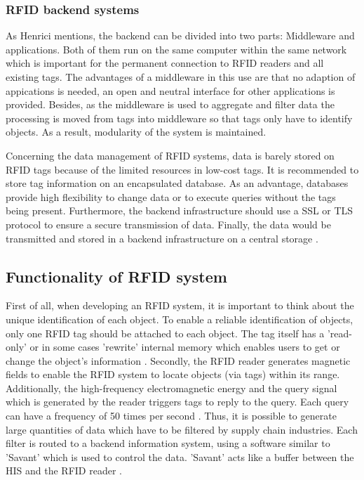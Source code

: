 \subsubsection{RFID backend systems} \label{backend}

As Henrici \cite{henrici} mentions, the backend can be divided into two parts: Middleware and applications. Both of them run on the same computer within the same network which is important for the permanent connection to RFID readers and all existing tags. The advantages of a middleware in this use are that no adaption of appications is needed, an open and neutral interface for other applications is provided. Besides, as the middleware is used to aggregate and filter data the processing is moved from tags into middleware so that tags only have to identify objects. As a result, modularity of the system is maintained.

Concerning the data management of RFID systems, data is barely stored on RFID tags because of the limited resources in low-cost tags. It is recommended \cite{henrici} to store tag information on an encapsulated database. As an advantage, databases provide high flexibility to change data or to execute queries without the tags being present. Furthermore, the backend infrastructure should use a \ac{SSL} or \ac{TLS} protocol to ensure a secure transmission of data. Finally, the data would be transmitted and stored in a backend infrastructure on a central storage \cite{henrici}.

\subsection{Functionality of RFID system}

First of all, when developing an RFID system, it is important to think about the unique identification of each object. To enable a reliable identification of objects, only one RFID tag should be attached to each object. The tag itself has a 'read-only' or in some cases 'rewrite' internal memory which enables users to get or change the object's information \cite{ncbi}. 
Secondly, the RFID reader generates magnetic fields to enable the RFID system to locate objects (via tags) within its range. Additionally, the high-frequency electromagnetic energy and the query signal which is generated by the reader triggers tags to reply to the query. Each query can have a frequency of 50 times per second \cite{ncbi}. Thus, it is possible to generate large quantities of data which have to be filtered by supply chain industries. Each filter is routed to a backend information system, using a software similar to 'Savant' which is used to control the data. 'Savant' acts like a buffer between the \ac{HIS} and the RFID reader \cite{ncbi}.

